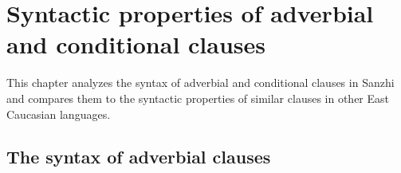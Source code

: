 \chapter{Syntactic properties of adverbial and conditional clauses}
\label{cpt:Syntactic properties of adverbial and conditional clauses}

This chapter analyzes the syntax of adverbial and conditional clauses in Sanzhi and compares them to the syntactic properties of similar clauses in other East Caucasian languages.



\section{The syntax of adverbial clauses}
\label{sec:The syntax of adverbial clauses}

